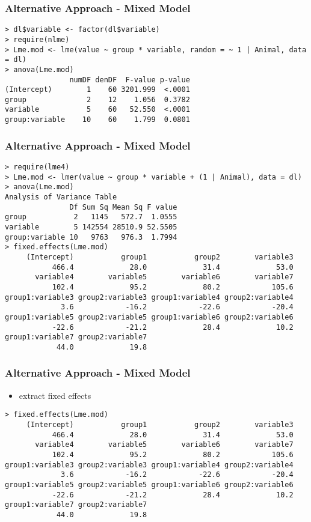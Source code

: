 \begin{frame}\frametitle{Alternative Approach - Mixed Model}\scriptsize
\begin{verbatim}
> dl$variable <- factor(dl$variable)
> require(nlme)
> Lme.mod <- lme(value ~ group * variable, random = ~ 1 | Animal, data = dl)
> anova(Lme.mod)
               numDF denDF  F-value p-value
(Intercept)        1    60 3201.999  <.0001
group              2    12    1.056  0.3782
variable           5    60   52.550  <.0001
group:variable    10    60    1.799  0.0801
\end{verbatim}
\end{frame}

\begin{frame}\frametitle{Alternative Approach - Mixed Model}
  \scriptsize
\begin{verbatim}
> require(lme4)
> Lme.mod <- lmer(value ~ group * variable + (1 | Animal), data = dl)
> anova(Lme.mod)
Analysis of Variance Table
               Df Sum Sq Mean Sq F value
group           2   1145   572.7  1.0555
variable        5 142554 28510.9 52.5505
group:variable 10   9763   976.3  1.7994
> fixed.effects(Lme.mod)
     (Intercept)           group1           group2        variable3 
           466.4             28.0             31.4             53.0 
       variable4        variable5        variable6        variable7 
           102.4             95.2             80.2            105.6 
group1:variable3 group2:variable3 group1:variable4 group2:variable4 
             3.6            -16.2            -22.6            -20.4 
group1:variable5 group2:variable5 group1:variable6 group2:variable6 
           -22.6            -21.2             28.4             10.2 
group1:variable7 group2:variable7 
            44.0             19.8 
\end{verbatim}
\end{frame}


\begin{frame}\frametitle{Alternative Approach - Mixed Model}
  \begin{itemize}
  \item extract fixed effects
  \end{itemize}
  \scriptsize
\begin{verbatim}
> fixed.effects(Lme.mod)
     (Intercept)           group1           group2        variable3 
           466.4             28.0             31.4             53.0 
       variable4        variable5        variable6        variable7 
           102.4             95.2             80.2            105.6 
group1:variable3 group2:variable3 group1:variable4 group2:variable4 
             3.6            -16.2            -22.6            -20.4 
group1:variable5 group2:variable5 group1:variable6 group2:variable6 
           -22.6            -21.2             28.4             10.2 
group1:variable7 group2:variable7 
            44.0             19.8 
\end{verbatim}
\end{frame}

